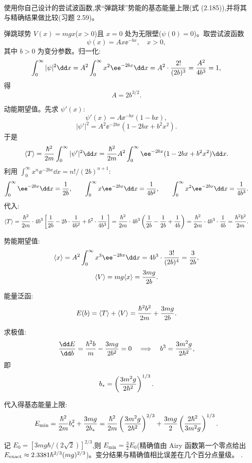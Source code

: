\begin{question}
使用你自己设计的尝试波函数,求“弹跳球”势能的基态能量上限(式 (2.185)),并将其与精确结果做比较(习题 2.59)。

\par\smallskip
{}

\end{question}
\begin{solution}
弹跳球势 $V(x)=mgx$($x>0$)且 $x=0$ 处为无限壁($\psi(0)=0$)。取尝试波函数
\[
\psi(x)=Ax\ee^{-bx},\quad x>0,
\]
其中 $b>0$ 为变分参数。归一化:
\[
\int_0^\infty|\psi|^2\dd x=A^2\int_0^\infty x^2\ee^{-2bx}\dd x
=A^2\cdot{2!\over(2b)^3}={A^2\over4b^3}=1,
\]
得
\[
A=2b^{3/2}.
\]

动能期望值。先求 $\psi'(x)$:
\[
\psi'(x)=A\ee^{-bx}(1-bx),
\]
\[
|\psi'|^2=A^2\ee^{-2bx}(1-2bx+b^2x^2).
\]
于是
\[
\langle T\rangle={\hbar^2\over2m}\int_0^\infty|\psi'|^2\dd x
={\hbar^2\over2m}A^2\int_0^\infty \ee^{-2bx}(1-2bx+b^2x^2)\dd x.
\]
利用 $\int_0^\infty x^n \ee^{-2bx}\dd x=n!/(2b)^{n+1}$:
\[
\int_0^\infty \ee^{-2bx}\dd x={1\over2b},\qquad
\int_0^\infty x \ee^{-2bx}\dd x={1\over4b^2},\qquad
\int_0^\infty x^2 \ee^{-2bx}\dd x={1\over4b^3}.
\]
代入:
\[
\langle T\rangle={\hbar^2\over2m}\cdot4b^3\left[{1\over2b}-2b\cdot{1\over4b^2}+b^2\cdot{1\over4b^3}\right]
={\hbar^2\over2m}\cdot4b^3\left({1\over2b}-{1\over2b}+{1\over4b}\right)
={\hbar^2\over2m}\cdot4b^3\cdot{1\over4b}
={\hbar^2b^2\over2m}.
\]

势能期望值:
\[
\langle x\rangle=A^2\int_0^\infty x^3\ee^{-2bx}\dd x
=4b^3\cdot{3!\over(2b)^4}={3\over2b},
\]
\[
\langle V\rangle=mg\langle x\rangle={3mg\over2b}.
\]

能量泛函:
\[
E(b)=\langle T\rangle+\langle V\rangle
={\hbar^2b^2\over2m}+{3mg\over2b}.
\]

求极值:
\[
{\dd E\over\dd b}={\hbar^2b\over m}-{3mg\over2b^2}=0
\quad\Longrightarrow\quad
b^3={3m^2g\over2\hbar^2},
\]
即
\[
b_*=\left({3m^2g\over2\hbar^2}\right)^{1/3}.
\]

代入得基态能量上限:
\[
E_{\min}={\hbar^2\over2m}b_*^2+{3mg\over2b_*}
={\hbar^2\over2m}\left({3m^2g\over2\hbar^2}\right)^{2/3}
+{3mg\over2}\left({2\hbar^2\over3m^2g}\right)^{1/3}.
\]

记 $E_0=[3mg\hbar/(2\sqrt2)]^{2/3}$,则 $E_{\min}=\frac32E_0$(精确值由 Airy 函数第一个零点给出 $E_{\rm exact}\approx2.3381\hbar^{2/3}(mg)^{2/3}$)。变分结果与精确值相比误差在几个百分点量级。
.
\end{solution}

